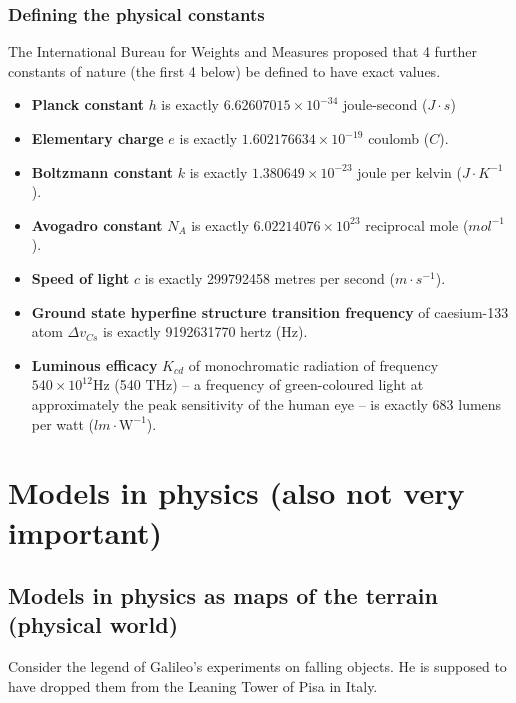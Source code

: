 \documentclass[11pt]{article}
\begin{document}
\newpage

\subsubsection{Defining the physical constants}
\label{sec:org22a2e03}
The International Bureau for Weights and Measures proposed that 4 further constants of nature (the first 4 below) be defined to have exact values.

\begin{itemize}
\item \textbf{Planck constant} \(h\) is exactly \(6.62607015 \times 10^{-34}\) joule-second (\(\si{J} \cdot \si{s}\))
\item \textbf{Elementary charge} \(e\) is exactly \(1.602176634 \times 10^{-19}\) coulomb (\(\si{C}\)).
\item \textbf{Boltzmann constant} \(k\) is exactly \(1.380649 \times 10^{-23}\) joule per kelvin (\(\si{J} \cdot \si{K}^{-1}\)).
\item \textbf{Avogadro constant} \(N_A\) is exactly \(6.02214076 \times 10^{23}\) reciprocal mole (\(\si{mol}^{-1}\)).
\item \textbf{Speed of light} \(c\) is exactly 299792458 metres per second (\(\si{m} \cdot \si{s}^{-1}\)).
\item \textbf{Ground state hyperfine structure transition frequency} of caesium-133 atom \(\Delta v_{Cs}\) is exactly 9192631770 hertz (\(\si{\hertz}\)).
\item \textbf{Luminous efficacy} \(K_{cd}\) of monochromatic radiation of frequency \(540 \times 10^{12} \si{\hertz}\) (540 \(\si{\tera\hertz}\)) – a frequency of green-coloured light at approximately the peak sensitivity of the human eye – is exactly 683 lumens per watt (\(\si{lm} \cdot \si{\watt}^{-1}\)).

\newpage
\end{itemize}

\section{Models in physics (also not very important)}
\label{sec:org0f54ed3}

\subsection{Models in physics as maps of the terrain (physical world)}
\label{sec:org19f7cb0}
Consider the legend of Galileo’s experiments on falling objects. He is supposed to have dropped them from the Leaning Tower of Pisa in Italy.
\\[0pt]
\end{document}
